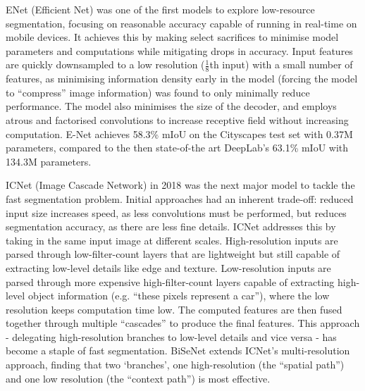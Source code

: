 \documentclass[a4paper,12pt]{report}
\begin{document}
ENet (Efficient Net) \cite{paszke_enet_2016} was one of the first models to explore low-resource segmentation, focusing on reasonable accuracy capable of running in real-time on mobile devices. It achieves this by making select sacrifices to minimise model parameters and computations while mitigating drops in accuracy. Input features are quickly downsampled to a low resolution ($\frac{1}{8}$th input) with a small number of features, as minimising information density early in the model (forcing the model to “compress” image information) was found to only minimally reduce performance. The model also minimises the size of the decoder, and employs atrous and factorised convolutions to increase receptive field without increasing computation. E-Net achieves 58.3\% mIoU on the Cityscapes test set with 0.37M parameters, compared to the then state-of-the art DeepLab’s 63.1\% mIoU with 134.3M parameters.

ICNet (Image Cascade Network) \cite{zhao_icnet_2018} in 2018 was the next major model to tackle the fast segmentation problem. Initial approaches had an inherent trade-off: reduced input size increases speed, as less convolutions must be performed, but reduces segmentation accuracy, as there are less fine details. ICNet addresses this by taking in the same input image at different scales. High-resolution inputs are parsed through low-filter-count layers that are lightweight but still capable of extracting low-level details like edge and texture. Low-resolution inputs are parsed through more expensive high-filter-count layers capable of extracting high-level object information (e.g. “these pixels represent a car”), where the low resolution keeps computation time low. The computed features are then fused together through multiple “cascades” to produce the final features. This approach - delegating high-resolution branches to low-level details and vice versa - has become a staple of fast segmentation. BiSeNet \cite{yu_bisenet_2018} extends ICNet’s multi-resolution approach, finding that two ‘branches’, one high-resolution (the “spatial path”) and one low resolution (the “context path”) is most effective.
\end{document}
